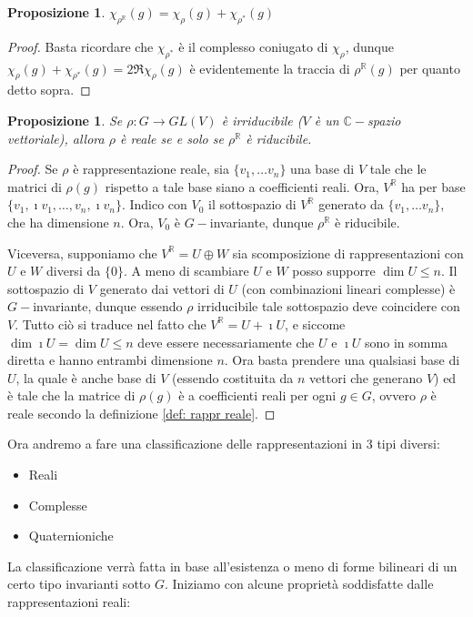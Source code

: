 \documentclass[11pt]{article}
\theoremstyle{plain}
\newtheorem{prop}[thm]{Proposizione}
\theoremstyle{definition}
\theoremstyle{remark}
\newcommand{\C}{\mathbb{C}}
\newcommand{\R}{\mathbb{R}}
\begin{document}
\begin{prop}
	$\chi_{\rho^\R}(g) = \chi_\rho(g) + \chi_{\rho^*}(g)$
\end{prop} 
\begin{proof}
	Basta ricordare che $\chi_{\rho^*}$ è il complesso coniugato di $\chi_\rho$, dunque
	$\chi_\rho(g) + \chi_{\rho^*}(g) = 2\Re \chi_\rho(g)$ è evidentemente la traccia di $\rho^\R(g)$ per
	quanto detto sopra.
\end{proof}


\begin{prop}
	Se $\rho:G\to GL(V)$ è irriducibile ($V$ è un $\C-$spazio vettoriale), allora $\rho$ è reale se e solo se $\rho^\R$ è riducibile.
\end{prop}
\begin{proof}
	Se $\rho$ è rappresentazione reale, sia $\{v_1,\dots v_n\}$ una 
	base di $V$ tale che le matrici di $\rho(g)$ rispetto a tale base siano a coefficienti reali.
	Ora, $V^\R$ ha per base $\{v_1, \imath v_1,\dots, v_n, \imath v_n\}$.
	Indico con $V_0$ il sottospazio di $V^\R$ generato da $\{v_1,\dots v_n\}$, che ha dimensione $n$.
	Ora, $V_0$ è $G-$invariante, dunque $\rho^\R$ è riducibile.
	
	Viceversa, supponiamo che $V^\R = U \oplus W$ sia scomposizione di rappresentazioni
	con $U$ e $W$ diversi da $\{0\}$. A meno di scambiare $U$ e $W$ posso supporre $\dim U \le n$.
	Il sottospazio di $V$ generato dai vettori di $U$ (con combinazioni lineari complesse) è $G-$invariante,
	dunque essendo $\rho$ irriducibile tale sottospazio deve coincidere con $V$.
	Tutto ciò si traduce nel fatto che $V^\R = U + \imath U$, e siccome $\dim\imath U = \dim U \le n$
	deve essere necessariamente che $U$ e $\imath U$ sono in somma diretta e hanno 
	entrambi dimensione $n$. Ora basta prendere una qualsiasi base di $U$,
	la quale è anche base di $V$ (essendo costituita da $n$ vettori che generano $V$) ed è tale che la matrice di $\rho(g)$ è 
	a coefficienti reali per ogni $g\in G$, ovvero $\rho$ è reale secondo la definizione \ref{def: rappr reale}.
\end{proof}

Ora andremo a fare una classificazione delle rappresentazioni in 3 tipi diversi:
\begin{itemize}
\item Reali
\item Complesse
\item Quaternioniche
\end{itemize}
La classificazione verrà fatta in base all'esistenza o meno di forme bilineari di un certo tipo invarianti sotto $G$.
Iniziamo con alcune proprietà soddisfatte dalle rappresentazioni reali:
\end{document}
